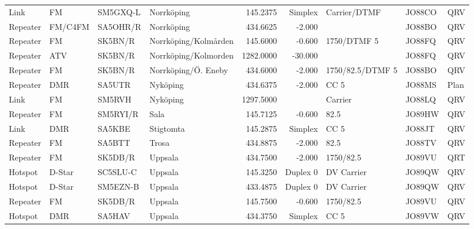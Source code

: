 {\begin{landscape}
\begin{longtable}{llllrrlll}
	Link              & FM         & SM5GXQ-L & Norrköping           &     145.2375 &    Simplex & Carrier/DTMF      & JO88CO      & QRV      \\
	Repeater          & FM/C4FM    & SA5OHR/R & Norrköping           &     434.6625 &     -2.000 &                   & JO88BO      & QRV      \\
	Repeater          & FM         & SK5BN/R  & Norrköping/Kolmården &     145.6000 &     -0.600 & 1750/DTMF 5       & JO88FQ      & QRV      \\
	Repeater          & ATV        & SK5BN/R  & Norrköping/Kolmorden &    1282.0000 &    -30.000 &                   & JO88FQ      & QRV      \\
	Repeater          & FM         & SK5BN/R  & Norrköping/Ö. Eneby  &     434.6000 &     -2.000 & 1750/82.5/DTMF 5  & JO88BO      & QRV      \\
	Repeater          & DMR        & SA5UTR   & Nyköping             &     434.6375 &     -2.000 & CC 5              & JO88MS      & Plan     \\
	Link              & FM         & SM5RVH   & Nyköping             &    1297.5000 &            & Carrier           & JO88LQ      & QRV      \\
	Repeater          & FM         & SM5RYI/R & Sala                 &     145.7125 &     -0.600 & 82.5              & JO89HW      & QRV      \\
	Link              & DMR        & SA5KBE   & Stigtomta            &     145.2875 &    Simplex & CC 5              & JO88JT      & QRV      \\
	Repeater          & FM         & SA5BTT   & Trosa                &     434.8875 &     -2.000 & 82.5              & JO88TV      & QRV      \\
	Repeater          & FM         & SK5DB/R  & Uppsala              &     434.7500 &     -2.000 & 1750/82.5         & JO89VU      & QRT      \\
	Hotspot           & D-Star     & SC5SLU-C & Uppsala              &     145.3250 &   Duplex 0 & DV Carrier        & JO89QW      & QRV      \\
	Hotspot           & D-Star     & SM5EZN-B & Uppsala              &     433.4875 &   Duplex 0 & DV Carrier        & JO89QW      & QRV      \\
	Repeater          & FM         & SK5DB/R  & Uppsala              &     145.7500 &     -0.600 & 1750/82.5         & JO89VU      & QRV      \\
	Hotspot           & DMR        & SA5HAV   & Uppsala              &     434.3750 &    Simplex & CC 5              & JO89VW      & QRV      \\

\end{longtable}
\end{landscape}}
